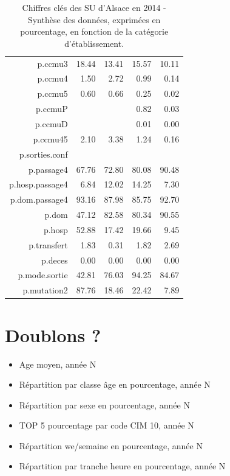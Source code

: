 \documentclass[]{article}
\begin{document}
\begin{table}[ht]
\begin{tabular}{rrrrr}
  p.ccmu3 & 18.44 & 13.41 & 15.57 & 10.11 \\ 
  p.ccmu4 & 1.50 & 2.72 & 0.99 & 0.14 \\ 
  p.ccmu5 & 0.60 & 0.66 & 0.25 & 0.02 \\ 
  p.ccmuP &  &  & 0.82 & 0.03 \\ 
  p.ccmuD &  &  & 0.01 & 0.00 \\ 
  p.ccmu45 & 2.10 & 3.38 & 1.24 & 0.16 \\ 
  p.sorties.conf &  &  &  &  \\ 
  p.passage4 & 67.76 & 72.80 & 80.08 & 90.48 \\ 
  p.hosp.passage4 & 6.84 & 12.02 & 14.25 & 7.30 \\ 
  p.dom.passage4 & 93.16 & 87.98 & 85.75 & 92.70 \\ 
  p.dom & 47.12 & 82.58 & 80.34 & 90.55 \\ 
  p.hosp & 52.88 & 17.42 & 19.66 & 9.45 \\ 
  p.transfert & 1.83 & 0.31 & 1.82 & 2.69 \\ 
  p.deces & 0.00 & 0.00 & 0.00 & 0.00 \\ 
  p.mode.sortie & 42.81 & 76.03 & 94.25 & 84.67 \\ 
  p.mutation2 & 87.76 & 18.46 & 22.42 & 7.89 \\ 
   \hline
\end{tabular}
\caption{Chiffres clés des SU d'Alsace en 2014 - Synthèse des données, exprimées en pourcentage, en fonction de la catégorie d'établissement.} 
\end{table}

\section{Doublons ?}\label{doublons}

\begin{itemize}
\itemsep1pt\parskip0pt
\item
  Age moyen, année N
\item
  Répartition par classe âge en pourcentage, année N
\item
  Répartition par sexe en pourcentage, année N
\item
  TOP 5 pourcentage par code CIM 10, année N
\item
  Répartition we/semaine en pourcentage, année N
\item
  Répartition par tranche heure en pourcentage, année N
\end{itemize}
\end{document}
